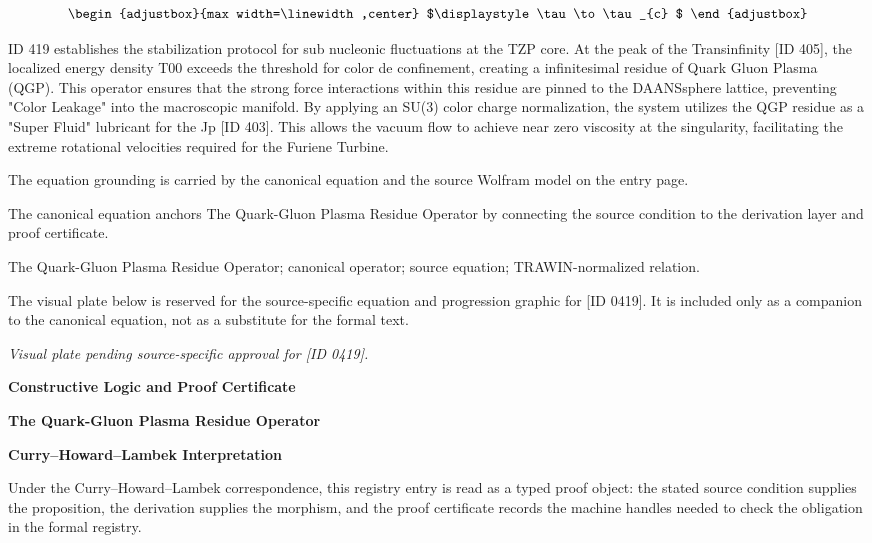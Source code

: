 \[
\begin{adjustbox}{max width=\linewidth,center}
$\displaystyle
\tau\to\tau_{c}
$
\end{adjustbox}
\]

ID 419 establishes the stabilization protocol for sub nucleonic fluctuations at the TZP core. At the peak of the Transinfinity [ID 405], the localized energy density T00 exceeds the threshold for color de confinement, creating a infinitesimal residue of Quark Gluon Plasma (QGP). This operator ensures that the strong force interactions within this residue are pinned to the DAANSsphere lattice, preventing "Color Leakage" into the macroscopic manifold. By applying an SU(3) color charge normalization, the system utilizes the QGP residue as a "Super Fluid" lubricant for the Jp [ID 403]. This allows the vacuum flow to achieve near zero viscosity at the singularity, facilitating the extreme rotational velocities required for the Furiene Turbine.

The equation grounding is carried by the canonical equation and the source Wolfram model on the entry page.

The canonical equation anchors The Quark-Gluon Plasma Residue Operator by connecting the source condition to the derivation layer and proof certificate.

The Quark-Gluon Plasma Residue Operator; canonical operator; source equation; TRAWIN-normalized relation.
\endgroup

\begingroup\footnotesize\sloppy
The visual plate below is reserved for the source-specific equation and progression graphic for [ID 0419]. It is included only as a companion to the canonical equation, not as a substitute for the formal text.
\par\endgroup
\begingroup\footnotesize\itshape
Visual plate pending source-specific approval for [ID 0419].
\par\endgroup

\clearpage
\begingroup\tzpsupportsetup
\noindent\textbf{\fontsize{10.8pt}{12.8pt}\selectfont [ID 0419] Constructive Logic and Proof Certificate}\par
\noindent\textbf{\fontsize{10pt}{12pt}\selectfont The Quark-Gluon Plasma Residue Operator}\par
\vspace{0.45em}
\begingroup
\footnotesize
\setlength{\parskip}{0.22em}
\setlength{\parindent}{0pt}
\noindent\textbf{Curry--Howard--Lambek Interpretation}\par
Under the Curry--Howard--Lambek correspondence, this registry entry is read as a typed proof
object: the stated source condition supplies the proposition, the derivation supplies the
morphism, and the proof certificate records the machine handles needed to check the obligation
in the formal registry.

